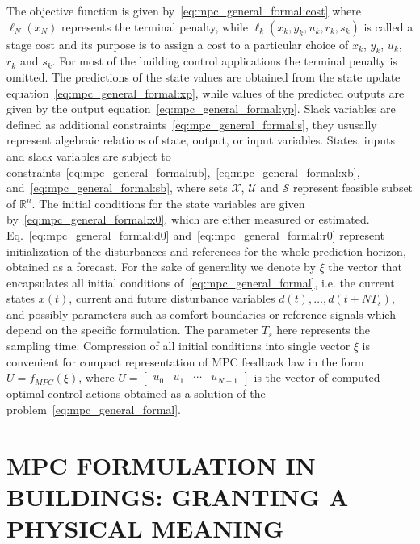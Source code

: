 \documentclass[10pt]{extarticle}
\begin{document}
The objective function is given by~\eqref{eq:mpc_general_formal:cost} where   $\ell_N(x_N)$  represents the terminal penalty, while $\ell_k(x_k,y_k,u_k,r_k,s_k)$  is called a stage cost and its
purpose is to assign a cost to a particular choice of $x_k$, $y_k$, $u_k$, $r_k$ and $s_k$. For most of the building control applications the terminal penalty is omitted.
The predictions of the state values are obtained from the state update equation~\eqref{eq:mpc_general_formal:xp}, while values of the predicted outputs are given by the output equation~\eqref{eq:mpc_general_formal:yp}.
Slack variables are defined as additional constraints~\eqref{eq:mpc_general_formal:s}, they ususally represent algebraic relations of state, output, or input variables.
% 
States, inputs and slack variables are subject to
constraints~\eqref{eq:mpc_general_formal:ub},~\eqref{eq:mpc_general_formal:xb}, and~\eqref{eq:mpc_general_formal:sb},
where sets  $\mathcal{X}$, $\mathcal{U}$ and $\mathcal{S}$ represent feasible subset of $\mathbb{R}^{n}$. 
% 
The initial conditions for the state variables are given by~\eqref{eq:mpc_general_formal:x0}, which are either  measured or estimated. 
Eq.~\eqref{eq:mpc_general_formal:d0} and~\eqref{eq:mpc_general_formal:r0} represent initialization of the disturbances and references  for the whole prediction horizon, obtained as a forecast.
% 
For the sake of generality we denote by $\xi$ the vector that encapsulates all initial conditions of~\eqref{eq:mpc_general_formal}, i.e. the current states $x(t)$, current and future disturbance variables $d(t), \ldots, d(t+N T_s)$, and possibly parameters such as comfort boundaries or reference signals which depend on the specific formulation.
The parameter $T_s$ here represents the sampling time.
Compression of all initial conditions into single vector $\xi$ is convenient for 
compact  representation of MPC feedback law in the form $U = f_{MPC}(\xi)$,
where $U = \begin{bmatrix} u_0 & u_1 & \cdots & u_{N-1} \end{bmatrix} $ is the vector of computed optimal control actions obtained as a solution of the problem~\eqref{eq:mpc_general_formal}.



\section{MPC FORMULATION IN BUILDINGS: GRANTING A PHYSICAL MEANING }
\end{document}
